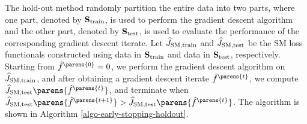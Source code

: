 The hold-out method randomly partition the entire data into two parts, where one part, denoted by $\mathbf{S}_{\mathrm{train}}$, 
is used to perform the gradient descent algorithm and the other part, denoted by $\mathbf{S}_{\mathrm{test}}$, 
is used to evaluate the performance of the corresponding gradient descent iterate. 
Let $\widehat{J}_{\mathrm{SM}, \mathrm{train}}$ and $\widehat{J}_{\mathrm{SM}, \mathrm{test}}$ be the SM loss functionals constructed using data in $\mathbf{S}_{\mathrm{train}}$ and data in $\mathbf{S}_{\mathrm{test}}$, respectively. Starting from $\hat{f}^{\parens{0}} = 0$, we perform the gradient descent algorithm on $\widehat{J}_{\mathrm{SM}, \mathrm{train}}$, and after obtaining a gradient descent iterate $\hat{f}^{\parens{t}}$, we compute $\widehat{J}_{\SM, \mathrm{test}} \parens{\hat{f}^{\parens{t}}}$, and terminate when $\widehat{J}_{\SM, \mathrm{test}} \parens{\hat{f}^{\parens{t+1}}} > \widehat{J}_{\SM, \mathrm{test}} \parens{\hat{f}^{\parens{t}}}$. The algorithm is shown in Algorithm \ref{algo-early-stopping-holdout}. 


